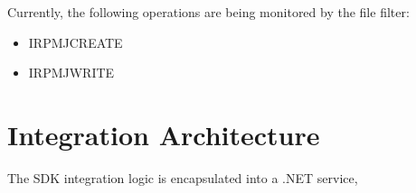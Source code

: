         Currently, the following operations are being monitored by the file filter:

        \begin{itemize}
            \item IRP\textunderscore MJ\textunderscore CREATE
            \item IRP\textunderscore MJ\textunderscore WRITE
        \end{itemize}
        

        
    \section{Integration Architecture}
    The SDK integration logic is encapsulated into a .NET service,


        